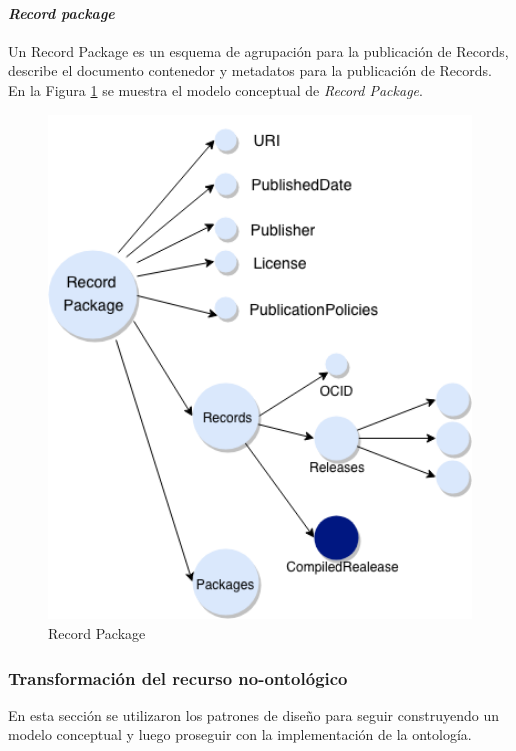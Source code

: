 \paragraph{\textit{Record package}}\hfill \break
Un Record Package es un esquema de agrupación para la publicación de Records, describe el documento contenedor y metadatos para la publicación de Records. En la Figura \ref{img:Record Package} se muestra el modelo conceptual de \textit{Record Package}.



\begin{figure}[ht!]
    \centering
    \includegraphics[width=150mm]{figuras/Diagramas-RecordPackage.png}
    \caption{Record Package}
    \label{img:Record Package}
\end{figure}


\subsubsection{Transformación del recurso no-ontológico}
En esta sección se utilizaron los patrones de diseño para seguir construyendo un modelo conceptual y luego proseguir con la implementación de la ontología. 
